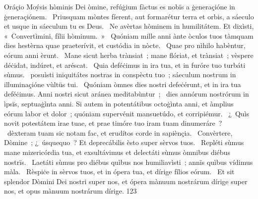 { Oráçio Moýsis hòminis Dei}
{%
òmine, refúġium fàctus es nobïs a ġeneraçióne in ġeneraçiónem. 
~Priusquam mòntes fíerent, aut formarétur terra et orbis, a sáeculo et usque in sáeculum tu es Deus. 
~Ne avèrtas hòminem in humilitátem. Et dixìsti, «~Convertìmini, fílii hòminum.~»
~Quóniam mille anni ànte òculos tuos tàmquam dies hestèrna quae praeterívit, et custódia in nòcte. 
~Quae pro nìhilo habèntur, eórum anni èrunt. 
~Mane sicut herba trànsiat~; mane flóriat, et trànsiat~; vèspere déċidat, indúret, et aréscat. 
~Quia deféċimus in ira tua, et in furóre tuo turbáti sùmus. 
~posuìsti iniquitátes nostras in conspèctu tuo~; sáeculum nostrum in illuminaçióne vùltüs tui. 
~Quóniam òmnes dies nostri defeċérunt, et in ira tua deféċimus. Anni nostri sicut aránea meditabùntur~; 
~dies annórum nostrórum in ìpsïs, septuaġìnta anni. Si autem in potentátibus octoġìnta anni, et àmplius eórum labor et dolor~; quóniam supervénit mansuetúdo, et corripiémur. 
~¿~Quìs novit potestátem irae tuae, et prae timóre tuo iram tuam dinumeráre~? 
~dèxteram tuam sic notam fac, et erudítos corde in sapiènçia. 
~Convèrtere, Dòmine~; ¿~úsquequo~? Et deprecábilis èsto super sèrvos tuos. 
~Repléti sùmus mane mizericórdia tua, et exsultávimus et delectáti sùmus òmnibus diébus nostrïs. 
~Laetáti sùmus pro diébus quìbus nos humiliavìsti~; annïs quìbus vídimus màla. 
~Rèspiċe in sèrvos tuos, et in ópera tua, et dírige fílios eórum. 
~Et sit splendor Dòmini Dei nostri super nos, et ópera mànuum nostrárum dírige super nos, et opus mànuum nostrárum dírige. 
}
{12}{3}
